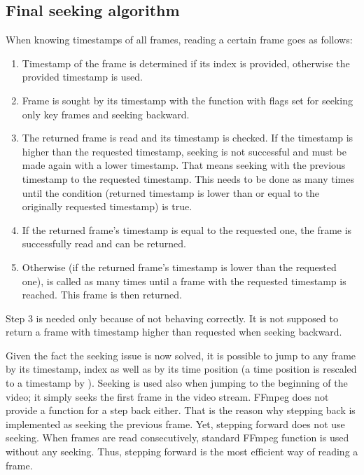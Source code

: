\subsection{Final seeking algorithm}
When knowing timestamps of all frames, reading a certain frame goes as follows:
\begin{enumerate}
\item Timestamp of the frame is determined if its index is provided, otherwise the provided timestamp is used.
\item Frame is sought by its timestamp with the function  with flags set for seeking only key frames and seeking backward.
\item The returned frame is read and its timestamp is checked. If the timestamp is higher than the requested timestamp, seeking is not successful and must be made again with a lower timestamp. That means seeking with the previous timestamp to the requested timestamp. This needs to be done as many times until the condition (returned timestamp is lower than or equal to the originally requested timestamp) is true.
\item If the returned frame’s timestamp is equal to the requested one, the frame is successfully read and can be returned.
\item Otherwise (if the returned frame’s timestamp is lower than the requested one),  is called as many times until a frame with the requested timestamp is reached. This frame is then returned.
\end{enumerate}
Step 3 is needed only because of  not behaving correctly. It is not supposed to return a frame with timestamp higher than requested when seeking backward.

Given the fact the seeking issue is now solved, it is possible to jump to any frame by its timestamp, index as well as by its time position (a time position is rescaled to a timestamp by ). Seeking is used also when jumping to the beginning of the video; it simply seeks the first frame in the video stream. FFmpeg does not provide a function for a step back either. That is the reason why stepping back is implemented as seeking the previous frame. Yet, stepping forward does not use seeking. When frames are read consecutively, standard FFmpeg function  is used without any seeking. Thus, stepping forward is the most efficient way of reading a frame.


